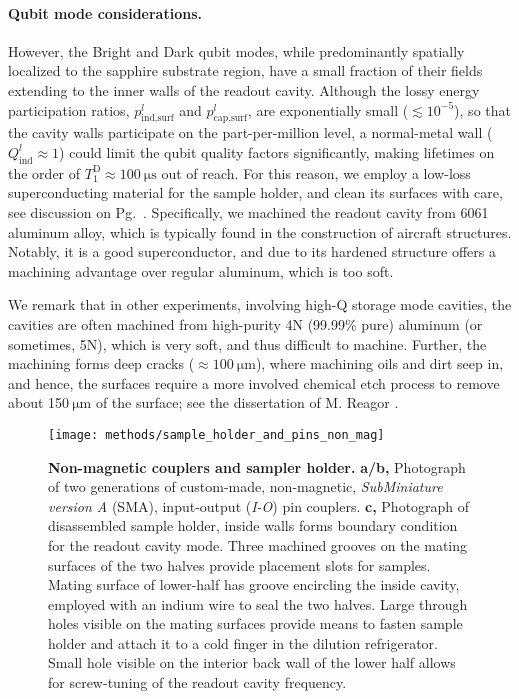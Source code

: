 \paragraph{Qubit mode considerations. }

However, the Bright and Dark qubit modes, while predominantly spatially
localized to the sapphire substrate region, have a small fraction
of their fields extending to the inner walls of the readout cavity.
Although the lossy energy participation ratios, $p_{\text{ind,surf}}^{l}$
and $p_{\text{cap,surf}}^{l}$, are exponentially small ($\lesssim10^{-5}$),
so that the cavity walls participate on the part-per-million level,
a normal-metal wall ($Q_{\mathrm{ind}}^{l}\approx1$) could limit
the qubit quality factors significantly, making lifetimes on the order
of $T_{\mathrm{1}}^{\mathrm{D}}\approx100\ \mathrm{\mu s}$ out of
reach. For this reason, we employ a low-loss superconducting material
for the sample holder, and clean its surfaces with care, see discussion
on Pg.~\pageref{par: Surface-preparation}. Specifically, we machined
the readout cavity from 6061 aluminum alloy, which is typically found
in the construction of aircraft structures. Notably, it is a good
superconductor, and due to its hardened structure offers a machining
advantage over regular aluminum, which is too soft. 

We remark that in other experiments, involving high-Q storage mode
cavities, the cavities are often machined from high-purity 4N (99.99\%
pure) aluminum (or sometimes, 5N), which is very soft, and thus difficult
to machine. Further, the machining forms deep cracks ($\approx100\ \mathrm{\mu m}$),
where machining oils and dirt seep in, and hence, the surfaces require
a more involved chemical etch process to remove about 150$\ \mathrm{\mu}$m
of the surface; see the dissertation of M. Reagor \citep{Reagor2016}.

\begin{figure}
\begin{centering}
\texttt{[image: methods/sample\_holder\_and\_pins\_non\_mag]}
\par\end{centering}
\caption[Non-magnetic couplers and sampler holder ]{\label{fig:Sample-holder-and-pins}\textbf{Non-magnetic couplers
and sampler holder.} \textbf{a/b, }Photograph of two generations of
custom-made, non-magnetic, \emph{SubMiniature version A} (SMA), input-output
(\emph{I-O}) pin couplers. \textbf{c,} Photograph of disassembled
sample holder, inside walls forms boundary condition for the readout
cavity mode. Three machined grooves on the mating surfaces of the
two halves provide placement slots for samples. Mating surface of
lower-half has groove encircling the inside cavity, employed with
an indium wire to seal the two halves. Large through holes visible
on the mating surfaces provide means to fasten sample holder and attach
it to a cold finger in the dilution refrigerator. Small hole visible
on the interior back wall of the lower half allows for screw-tuning
of the readout cavity frequency.}
\end{figure}


